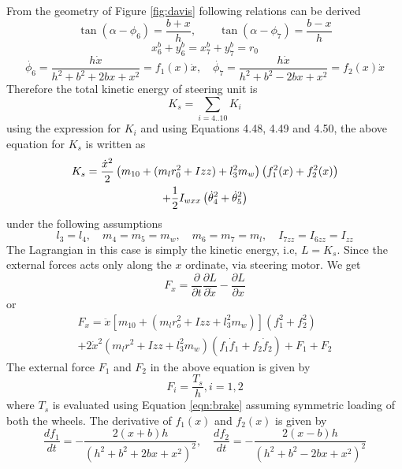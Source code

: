 {From the geometry of Figure \ref{fig:davis} following relations can be derived 
\begin{equation}
\label{eqn:thetaTox}
\tan(\alpha-\phi_6)=\frac{b+x}{h}, \quad \quad \tan(\alpha-\phi_7)=\frac{b-x}{h}
\end{equation}
\begin{equation}
\label{ro}
x^b_6+y^b_6=x^b_7+y^b_7=r_0
\end{equation}
\begin{equation}
\dot{\phi_6}=\dfrac{h\dot x}{h^2+b^2+2bx+x^2}=f_1(x)\dot x,\quad \dot{\phi_7}=\dfrac{h\dot x}{h^2+b^2-2bx+x^2}=f_2(x)\dot x
\end{equation}
 Therefore the total kinetic energy of steering unit is 
\[K_s=\sum_{i=4..10}K_i\]
using the expression for $K_i$  and using Equations 4.48, 4.49 and 4.50, the above equation for $K_s$  is written as 
\begin{multline}
	K_s=\frac{\dot x^2}{2} \left( m_{10}+(m_l r^2_0+I{zz})+l^2_3m_w \right) \left(f^2_1(x)+f^2_2(x) \right)\\ + \frac{1}{2} I_{wxx}\left(\dot\theta^2_4  +\dot\theta^2_5\right)
\end{multline}
under the following assumptions \[l_3=l_4, \quad m_4=m_5=m_w, \quad m_6=m_7=m_l, \quad I_{7zz}=I_{6zz}=I_{zz}\]
The Lagrangian in this case is simply the kinetic energy, i.e,  $L=K_s$. Since the external forces acts only along the $x$ ordinate, via steering motor. We get
\[F_x= \dfrac{\partial}{\partial t}\dfrac{\partial L}{\partial \dot x} - \dfrac{\partial L}{\partial x}\]
or 
\begin{multline}
\label{eqn:SteerDyn}
F_x=\ddot{x}\left[ m_{10}+\left(m_lr_o^2+I{zz}+l^2_3m_w \right) \right] \left( f_1^2+f_2^2 \right)\\
+2\dot x^2 \left(m_lr^2+I{zz}+l_3^2 m_w \right) \left( f_1 \dot f_1 +f_2 \dot f_2\right)+F_1+F_2
\end{multline}
The external force $F_1$ and $F_2$ in the above equation is given by
\[F_i=\dfrac{T_s}{h},i={1,2} \]
where $T_s$ is evaluated using Equation \ref{eqn:brake} assuming symmetric loading of both the wheels. The derivative of $f_1(x)$ and  $f_2(x)$ is given by 
\[ \dfrac{df_1}{dt}=-\dfrac{2(x+b)h}{(h^2+b^2+2bx+x^2)^2}, \quad \dfrac{df_2}{dt}=-\dfrac{2(x-b)h}{(h^2+b^2-2bx+x^2)^2}\]



}
